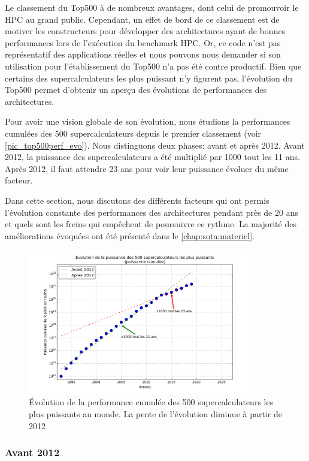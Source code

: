    Le classement du Top500 à de nombreux avantages, dont celui de promouvoir le HPC au grand public. Cependant, un effet de bord de ce classement est de motiver les constructeurs pour développer des architectures ayant de bonnes performances lors de l'exécution du benchmark HPC. Or, ce code n'est pas représentatif des applications réelles et nous pouvons nous demander si son utilisation pour l'établissement du Top500 n'a pas été contre productif. Bien que certains des supercalculateurs les plus puissant n'y figurent pas, l'évolution du Top500 permet d'obtenir un aperçu des évolutions de performances des architectures.
    
    
    Pour avoir une vision globale de son évolution, nous étudions la performances cumulées des 500 supercalculateurs depuis le premier classement (voir \autoref{pic_top500perf_evo}). Nous distinguons deux phases: avant et après 2012. 
    Avant 2012, la puissance des supercalculateurs a été multiplié par 1000 tout les 11 ans. Après 2012, il faut attendre 23 ans pour voir leur puissance évoluer du même facteur. 
    
    Dans cette section, nous discutons des différents facteurs qui ont permis l'évolution constante des performances des architectures pendant près de 20 ans et quels sont les freins qui empêchent de poursuivre ce rythme. La majorité des améliorations évoquées ont été présenté dans le \autoref{chap:sota:materiel}.
    
    \begin{figure}
        \center
        \includegraphics[width=10cm]{images/top500_evolution.png}
        \caption{\label{pic_top500perf_evo} Évolution de la performance cumulée des 500 supercalculateurs les plus puissants au monde. La pente de l'évolution diminue à partir de 2012}
    \end{figure}


    \subsubsection{Avant 2012}
    
